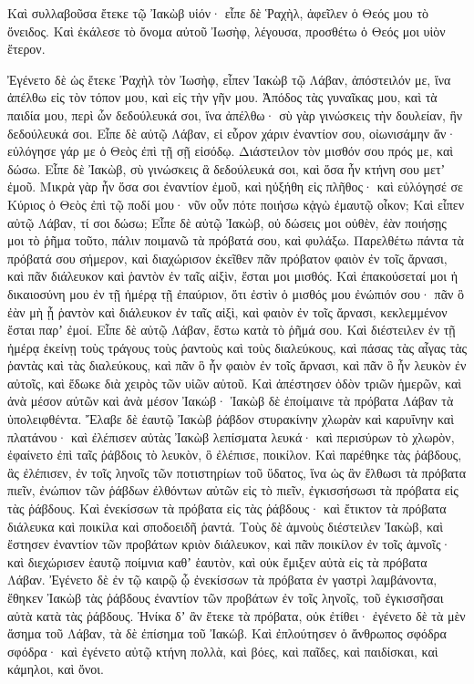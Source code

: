 {Καὶ συλλαβοῦσα ἔτεκε τῷ Ἰακὼβ υἱόν· εἶπε δὲ Ῥαχὴλ, ἀφεῖλεν ὁ Θεός μου τὸ ὄνειδος.
Καὶ ἐκάλεσε τὸ ὄνομα αὐτοῦ Ἰωσὴφ, λέγουσα, προσθέτω ὁ Θεός μοι υἱὸν ἕτερον.
\par }{\PP {}Ἐγένετο δὲ ὡς ἔτεκε Ῥαχὴλ τὸν Ἰωσὴφ, εἶπεν Ἰακὼβ τῷ Λάβαν, ἀπόστειλόν με, ἵνα ἀπέλθω εἰς τὸν τόπον μου, καὶ εἰς τὴν γῆν μου.
Ἀπόδος τὰς γυναῖκας μου, καὶ τὰ παιδία μου, περὶ ὧν δεδούλευκά σοι, ἵνα ἀπέλθω· σὺ γὰρ γινώσκεις τὴν δουλείαν, ἣν δεδούλευκά σοι.
Εἶπε δὲ αὐτῷ Λάβαν, εἰ εὗρον χάριν ἐναντίον σου, οἰωνισάμην ἄν· εὐλόγησε γάρ με ὁ Θεὸς ἐπὶ τῇ σῇ εἰσόδῳ.
Διάστειλον τὸν μισθόν σου πρός με, καὶ δώσω.
Εἶπε δὲ Ἰακὼβ, σὺ γινώσκεις ἃ δεδούλευκά σοι, καὶ ὅσα ἦν κτήνη σου μετʼ ἐμοῦ.
Μικρὰ γὰρ ἦν ὅσα σοι ἐναντίον ἐμοῦ, καὶ ηὐξήθη εἰς πλῆθος· καὶ εὐλόγησέ σε Κύριος ὁ Θεὸς ἐπὶ τῷ ποδί μου· νῦν οὖν πότε ποιήσω κᾀγὼ ἐμαυτῷ οἶκον;
Καὶ εἶπεν αὐτῷ Λάβαν, τί σοι δώσω; Εἶπε δὲ αὐτῷ Ἰακὼβ, οὐ δώσεις μοι οὐθὲν, ἐὰν ποιήσῃς μοι τὸ ῥῆμα τοῦτο, πάλιν ποιμανῶ τὰ πρόβατά σου, καὶ φυλάξω.
Παρελθέτω πάντα τὰ πρόβατά σου σήμερον, καὶ διαχώρισον ἐκεῖθεν πᾶν πρόβατον φαιὸν ἐν τοῖς ἄρνασι, καὶ πᾶν διάλευκον καὶ ῥαντὸν ἐν ταῖς αἰξὶν, ἔσται μοι μισθός.
Καὶ ἐπακούσεταί μοι ἡ δικαιοσύνη μου ἐν τῇ ἡμέρᾳ τῇ ἐπαύριον, ὅτι ἐστὶν ὁ μισθός μου ἐνώπιόν σου· πᾶν ὃ ἐὰν μὴ ᾖ ῥαντὸν καὶ διάλευκον ἐν ταῖς αἰξὶ, καὶ φαιὸν ἐν τοῖς ἄρνασι, κεκλεμμένον ἔσται παρʼ ἐμοί.
Εἶπε δὲ αὐτῷ Λάβαν, ἔστω κατὰ τὸ ῥῆμά σου.
Καὶ διέστειλεν ἐν τῇ ἡμέρᾳ ἐκείνῃ τοὺς τράγους τοὺς ῥαντοὺς καὶ τοὺς διαλεύκους, καὶ πάσας τὰς αἶγας τὰς ῥαντὰς καὶ τὰς διαλεύκους, καὶ πᾶν ὃ ἦν φαιὸν ἐν τοῖς ἄρνασι, καὶ πᾶν ὃ ἦν λευκὸν ἐν αὐτοῖς, καὶ ἔδωκε διὰ χειρὸς τῶν υἱῶν αὐτοῦ.
Καὶ ἀπέστησεν ὁδὸν τριῶν ἡμερῶν, καὶ ἀνὰ μέσον αὐτῶν καὶ ἀνὰ μέσον Ἰακώβ· Ἰακὼβ δὲ ἐποίμαινε τὰ πρόβατα Λάβαν τὰ ὑπολειφθέντα.
Ἔλαβε δὲ ἑαυτῷ Ἰακὼβ ῥάβδον στυρακίνην χλωρὰν καὶ καρυΐνην καὶ πλατάνου· καὶ ἐλέπισεν αὐτὰς Ἰακὼβ λεπίσματα λευκά· καὶ περισύρων τὸ χλωρὸν, ἐφαίνετο ἐπὶ ταῖς ῥάβδοις τὸ λευκὸν, ὃ ἐλέπισε, ποικίλον.
Καὶ παρέθηκε τὰς ῥάβδους, ἃς ἐλέπισεν, ἐν τοῖς ληνοῖς τῶν ποτιστηρίων τοῦ ὕδατος, ἵνα ὡς ἂν ἔλθωσι τὰ πρόβατα πιεῖν, ἐνώπιον τῶν ῥάβδων ἐλθόντων αὐτῶν εἰς τὸ πιεῖν, ἐγκισσήσωσι τὰ πρόβατα εἰς τὰς ῥάβδους.
Καὶ ἐνεκίσσων τὰ πρόβατα εἰς τὰς ῥάβδους· καὶ ἔτικτον τὰ πρόβατα διάλευκα καὶ ποικίλα καὶ σποδοειδῆ ῥαντά.
Τοὺς δὲ ἀμνοὺς διέστειλεν Ἰακὼβ, καὶ ἔστησεν ἐναντίον τῶν προβάτων κριὸν διάλευκον, καὶ πᾶν ποικίλον ἐν τοῖς ἀμνοῖς· καὶ διεχώρισεν ἑαυτῷ ποίμνια καθʼ ἑαυτὸν, καὶ οὐκ ἔμιξεν αὐτὰ εἰς τὰ πρόβατα Λάβαν.
Ἐγένετο δὲ ἐν τῷ καιρῷ ᾧ ἐνεκίσσων τὰ πρόβατα ἐν γαστρὶ λαμβάνοντα, ἔθηκεν Ἰακὼβ τὰς ῥάβδους ἐναντίον τῶν προβάτων ἐν τοῖς ληνοῖς, τοῦ ἐγκισσῆσαι αὐτὰ κατὰ τὰς ῥάβδους.
Ἡνίκα δʼ ἂν ἔτεκε τὰ πρόβατα, οὐκ ἐτίθει· ἐγένετο δὲ τὰ μὲν ἄσημα τοῦ Λάβαν, τὰ δὲ ἐπίσημα τοῦ Ἰακώβ.
Καὶ ἐπλούτησεν ὁ ἄνθρωπος σφόδρα σφόδρα· καὶ ἐγένετο αὐτῷ κτήνη πολλὰ, καὶ βόες, καὶ παῖδες, καὶ παιδίσκαι, καὶ κάμηλοι, καὶ ὄνοι.

}
